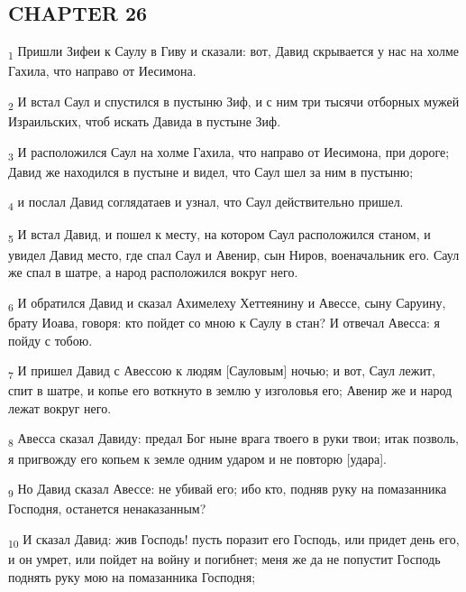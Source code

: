 \subsection{CHAPTER 26}
\begin{tcolorbox}
\textsubscript{1} Пришли Зифеи к Саулу в Гиву и сказали: вот, Давид скрывается у нас на холме Гахила, что направо от Иесимона.
\end{tcolorbox}
\begin{tcolorbox}
\textsubscript{2} И встал Саул и спустился в пустыню Зиф, и с ним три тысячи отборных мужей Израильских, чтоб искать Давида в пустыне Зиф.
\end{tcolorbox}
\begin{tcolorbox}
\textsubscript{3} И расположился Саул на холме Гахила, что направо от Иесимона, при дороге; Давид же находился в пустыне и видел, что Саул шел за ним в пустыню;
\end{tcolorbox}
\begin{tcolorbox}
\textsubscript{4} и послал Давид соглядатаев и узнал, что Саул действительно пришел.
\end{tcolorbox}
\begin{tcolorbox}
\textsubscript{5} И встал Давид, и пошел к месту, на котором Саул расположился станом, и увидел Давид место, где спал Саул и Авенир, сын Ниров, военачальник его. Саул же спал в шатре, а народ расположился вокруг него.
\end{tcolorbox}
\begin{tcolorbox}
\textsubscript{6} И обратился Давид и сказал Ахимелеху Хеттеянину и Авессе, сыну Саруину, брату Иоава, говоря: кто пойдет со мною к Саулу в стан? И отвечал Авесса: я пойду с тобою.
\end{tcolorbox}
\begin{tcolorbox}
\textsubscript{7} И пришел Давид с Авессою к людям [Сауловым] ночью; и вот, Саул лежит, спит в шатре, и копье его воткнуто в землю у изголовья его; Авенир же и народ лежат вокруг него.
\end{tcolorbox}
\begin{tcolorbox}
\textsubscript{8} Авесса сказал Давиду: предал Бог ныне врага твоего в руки твои; итак позволь, я пригвожду его копьем к земле одним ударом и не повторю [удара].
\end{tcolorbox}
\begin{tcolorbox}
\textsubscript{9} Но Давид сказал Авессе: не убивай его; ибо кто, подняв руку на помазанника Господня, останется ненаказанным?
\end{tcolorbox}
\begin{tcolorbox}
\textsubscript{10} И сказал Давид: жив Господь! пусть поразит его Господь, или придет день его, и он умрет, или пойдет на войну и погибнет; меня же да не попустит Господь поднять руку мою на помазанника Господня;
\end{tcolorbox}

